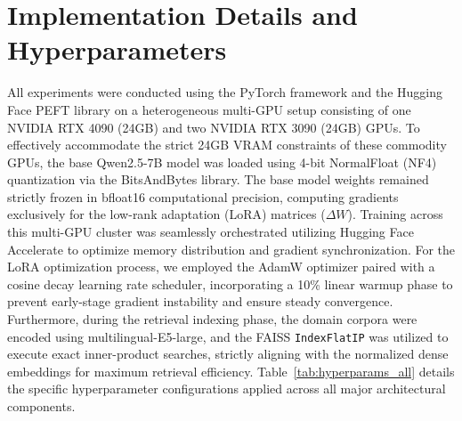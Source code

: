 \documentclass[a4paper,fleql]{cas-sc}
\begin{document}
\section{Implementation Details and Hyperparameters}
\label{sec:implementation}
All experiments were conducted using the PyTorch framework and the Hugging Face
PEFT library on a heterogeneous multi-GPU setup consisting of one NVIDIA RTX
4090 (24GB) and two NVIDIA RTX 3090 (24GB) GPUs. To effectively accommodate the
strict 24GB VRAM constraints of these commodity GPUs, the base Qwen2.5-7B model
was loaded using 4-bit NormalFloat (NF4) quantization via the BitsAndBytes library.
The base model weights remained strictly frozen in bfloat16 computational precision,
computing gradients exclusively for the low-rank adaptation (LoRA) matrices ($\Delta W$).
Training across this multi-GPU cluster was seamlessly orchestrated utilizing Hugging Face
Accelerate to optimize memory distribution and gradient synchronization. For the LoRA
optimization process, we employed the AdamW optimizer paired with a cosine decay
learning rate scheduler, incorporating a 10\% linear warmup phase to prevent early-stage
gradient instability and ensure steady convergence. Furthermore, during the retrieval
indexing phase, the domain corpora were encoded using multilingual-E5-large, and the
FAISS \texttt{IndexFlatIP} was utilized to execute exact inner-product searches, strictly
aligning with the normalized dense embeddings for maximum retrieval efficiency.
Table~\ref{tab:hyperparams_all} details the specific hyperparameter configurations
applied across all major architectural components.
\end{document}
